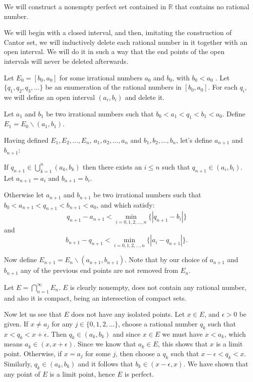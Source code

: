 \documentclass[12pt]{article}
\newcommand{\disp}{\displaystyle}
\begin{document}
We will construct a nonempty perfect set contained in $\mathbb{R}$ that
contains no rational number.

We will begin with a closed interval, and then, imitating the
construction of Cantor set, we will inductively delete each
rational number in it together with an open interval.  We will do
it in such a way that the end points of the open intervals will
never be deleted afterwards.

Let $E_0 = [b_0, a_0]$ for some irrational numbers $a_0$ and $b_0$,
 with $b_0<a_0$
. Let $\{ q_1, q_2, q_3, \ldots \}$ be an enumeration of the
rational numbers in $[b_0, a_0]$. For each $q_i$, we will define an
open interval $(a_i,b_i)$ and delete it.

Let $a_1$ and $b_1$ be two irrational numbers such that
$b_0<a_1<q_1<b_1<a_0$. Define $E_1 = E_0\backslash (a_1,b_1)$.

Having defined $ E_1,E_2,\ldots,E_n$, $ a_1,a_2,\ldots,a_n $ and $
b_1,b_2,\ldots,b_n $, let's define $a_{n+1}$ and $b_{n+1}$:

If  $\disp q_{n+1}\in \bigcup_{k=1}^n (a_k,b_k)$ then there exists
an $i\leq n$ such that $q_{n+1}\in  (a_i,b_i)$.  Let $a_{n+1}=a_i$
and $b_{n+1}=b_i$.

Otherwise let $a_{n+1}$ and $b_{n+1}$ be two irrational numbers
such that $b_0<a_{n+1}<q_{n+1}<b_{n+1}<a_0$, and which satisfy:
$$
\disp q_{n+1} - a_{n+1} < \min_{i=0,1,2,\ldots,n}\{|q_{n+1} -
b_i|\}$$ and $$\disp b_{n+1} - q_{n+1} <
\min_{i=0,1,2,\ldots,n}\{|a_i - q_{n+1}|\}.
$$



Now define $E_{n+1}=E_n\backslash (a_{n+1},b_{n+1})$.  Note that
by our choice of $a_{n+1}$ and $b_{n+1}$ any of the previous end
points are not removed from $E_n$.

Let $\disp E = \bigcap_{n=1}^\infty E_n$.  $E$ is clearly
nonempty, does not contain any rational number, and also it is
compact, being an intersection of compact sets.

Now let us see that $E$ does not have any isolated points. Let
$x\in E$, and $\epsilon>0$ be given. If $x\neq a_j$ for any $j \in \{0,1,2,\ldots\}$, choose a rational number
$q_k$ such that $x<q_k<x+\epsilon$.  Then $q_k\in(a_k,b_k)$ and
since $x\in E$ we must have $x<a_k$, which means $a_k \in (x,
x+\epsilon)$. Since we know that $a_k\in E $, this shows that $x$ is a limit point.  Otherwise, if $x = a_j$ for some $j$, then choose a $q_k$ such that $x-\epsilon < q_k < x$. Similarly, $q_k \in (a_k, b_k)$ and it follows that $b_k\in (x-\epsilon, x)$.    We have shown that
any point of $E$ is a limit point, hence $E$ is perfect.
\end{document}
